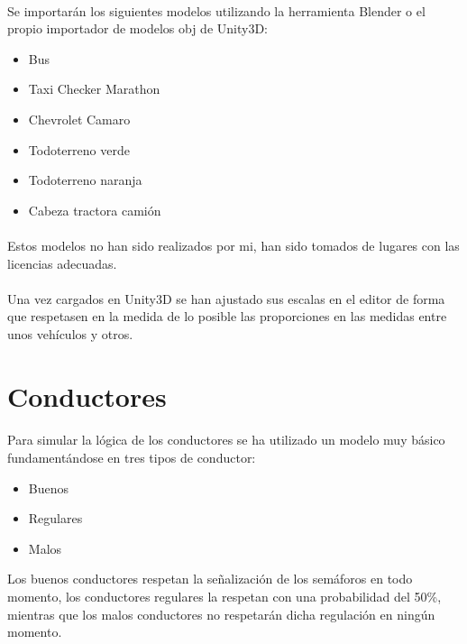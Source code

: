 	\paragraph{}
	Se importarán los siguientes modelos utilizando la herramienta Blender \cite{Blender_web} o el propio importador de modelos obj de Unity3D:
	\begin{itemize}
		\item Bus
		\item Taxi Checker Marathon
		\item Chevrolet Camaro
		\item Todoterreno verde
		\item Todoterreno naranja
		\item Cabeza tractora camión
	\end{itemize}
	
	\paragraph{}	
	Estos modelos no han sido realizados por mi, han sido tomados de lugares con las licencias adecuadas.
	
	\paragraph{}
	Una vez cargados en Unity3D se han ajustado sus escalas en el editor de forma que respetasen en la medida de lo posible las proporciones en las medidas entre unos vehículos y otros.
	
\section{Conductores}
\label{section:driverBehaviour}
	\paragraph{}
	Para simular la lógica de los conductores se ha utilizado un modelo muy básico fundamentándose en tres tipos de conductor:
	
	\begin{itemize}
	\item Buenos
	\item Regulares
	\item Malos
	\end{itemize}
	
	Los buenos conductores respetan la señalización de los semáforos en todo momento, los conductores regulares la respetan con una probabilidad del 50\%, mientras que los malos conductores no respetarán dicha regulación en ningún momento.
	
